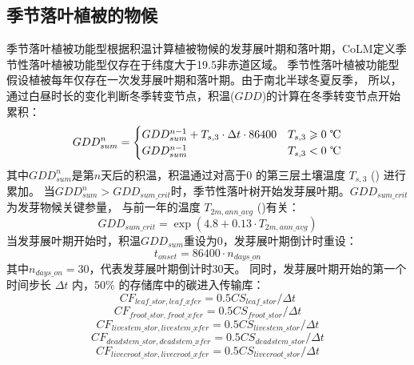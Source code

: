 \subsection{季节落叶植被的物候}\label{季节落叶植被的物候}
季节落叶植被功能型根据积温计算植被物候的发芽展叶期和落叶期，CoLM定义季节性落叶植被功能型仅存在于纬度大于19.5\textdegree 非赤道区域。
季节性落叶植被功能型假设植被每年仅存在一次发芽展叶期和落叶期。由于南北半球冬夏反季，
所以，通过白昼时长的变化判断冬季转变节点，积温($GDD$)的计算在冬季转变节点开始累积\citep{white1997continental}：
\begin{equation}
GDD _{sum}^{n}=\begin{cases}
GDD _{sum}^{n-1}+T_{s, 3} \cdot \Delta t \cdot 86400 & T_{s, 3} \geqslant \text{0 \textcelsius} \\ 
GDD _{sum}^{n-1} & T_{s, 3}< \text{0 \textcelsius}
\end{cases}
\end{equation}
其中$GDD_{sum}^n$是第$n$天后的积温，积温通过对高于0 \textcelsius 的第三层土壤温度 $T_{s,3}$ (\textcelsius) 进行累加。
当$GDD_{sum}^n>{GDD}_{sum\_{crit}}$时，季节性落叶树开始发芽展叶期。${GDD}_{sum\_{crit}}$ 为发芽物候关键参量，
与前一年的温度 $T_{2m,ann\_{avg}}$ (\textcelsius)有关：
\begin{equation}
GDD _{sum\_{crit}}=\exp \left(4.8+0.13 \cdot T_{2 m, ann\_{avg}}\right)
\end{equation}
当发芽展叶期开始时，积温${GDD}_{sum}$重设为0，发芽展叶期倒计时重设：
\begin{equation}
t_{onset}=86400 \cdot n_{days\_on}
\end{equation}
其中$n_{days\_on}=30$，代表发芽展叶期倒计时30天。
同时，发芽展叶期开始的第一个时间步长 $\Delta t$ 内，50\% 的存储库中的碳进入传输库：
\begin{equation}
  CF_{leaf\_{stor},leaf\_{xfer}} = 0.5 CS_{leaf\_{stor}}/\Delta t
\end{equation}
\begin{equation}
  CF_{froot\_{stor},froot\_{xfer}} = 0.5  CS_{froot\_{stor}}/\Delta t
\end{equation}
\begin{equation}
  CF_{livestem\_{stor},livestem\_{xfer}} = 0.5  CS_{livestem\_{stor}}/\Delta t
\end{equation}
\begin{equation}
  CF_{deadstem\_{stor},deadstem\_{xfer}} = 0.5  CS_{deadstem\_{stor}}/\Delta t
\end{equation}
\begin{equation}
  CF_{livecroot\_{stor},livecroot\_{xfer}} = 0.5  CS_{livecroot\_{stor}}/\Delta t
\end{equation}
